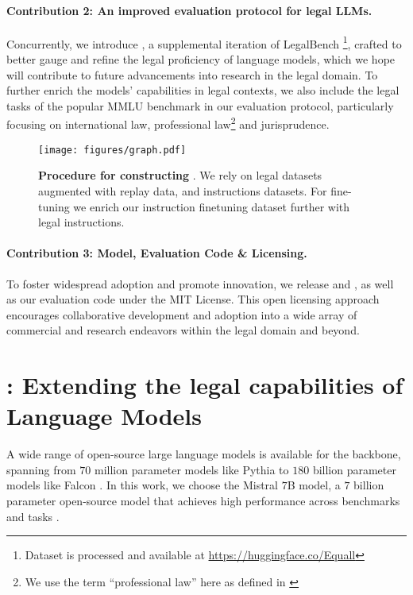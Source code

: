 \paragraph{Contribution 2: An improved evaluation protocol for legal LLMs.} Concurrently, we introduce \legalbench{}, a supplemental iteration of LegalBench \cite{guha2022legalbench,guha2023legalbench}\footnote{Dataset is processed and available at \url{https://huggingface.co/Equall}}, crafted to better gauge and refine the legal proficiency of language models, which we hope will contribute to future advancements into research in the legal domain. To further enrich the models' capabilities in legal contexts, we also include the legal tasks of the popular MMLU benchmark \cite{hendrycks2020measuring} in our evaluation protocol, particularly focusing on international law, professional law\footnote{We use the term ``professional law'' here as defined in \citep{hendrycks2020measuring}} and jurisprudence.
\begin{figure*}[!ht]
    \centering
    \texttt{[image: figures/graph.pdf]}
    \caption{\textbf{Procedure for constructing \ourmodel{}}. We rely on legal datasets augmented with replay data, and instructions datasets. For fine-tuning we enrich our instruction finetuning dataset further with legal instructions.}
    \label{fig:main_saul}
\end{figure*}

\paragraph{Contribution 3: Model, Evaluation Code \& Licensing.} To foster widespread adoption and promote innovation, we release \ourmodel{} and \ourmodelift{}, as well as our evaluation code under the MIT License. This open licensing approach encourages collaborative development and adoption into a wide array of commercial and research endeavors within the legal domain and beyond.

\section{\ourmodel{}: Extending the legal capabilities of Language Models}

A wide range of open-source large language models is available for the backbone, spanning from $70$ million parameter models like Pythia \citep{biderman2023pythia} to $180$ billion parameter models like Falcon \citep{falcon}. In this work, we choose the Mistral $7$B model, a $7$ billion parameter open-source model that achieves high performance across benchmarks and tasks \citep{jiang2023mistral}.

